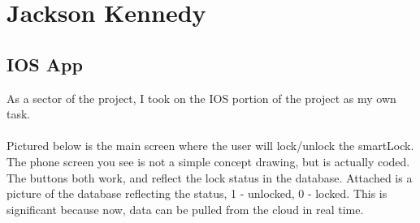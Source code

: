\section{Jackson Kennedy}

\subsection{IOS App}
As a sector of the project, I took on the IOS portion of the project as my own task.
\\\\
Pictured below is the main screen where the user will lock/unlock the smartLock. The phone screen you see is not a simple concept drawing, but is actually coded. The buttons both work, and reflect the lock status in the database. Attached is a picture of the database reflecting the status, 1 - unlocked, 0 - locked. This is significant because now, data can be pulled from the cloud in real time.
